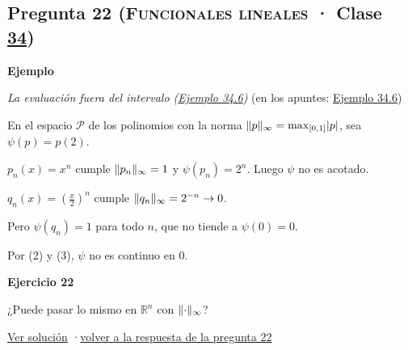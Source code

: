\documentclass[11pt,a4paper]{article}
\newcommand{\R}{\mathbb{R}}\newcommand{\N}{\mathbb{N}}\newcommand{\Q}{\mathbb{Q}}
\newcommand{\bloque}[1]{\par\smallskip\noindent\textbf{\color{acento}#1}\par}
\begin{document}
\subsection*{\hypertarget{e-22}{}Pregunta 22 \normalfont\small(\textsc{Funcionales lineales} · Clase \href{https://decostruttivismo.github.io/MAT2514-repaso/pdf/MAT2514_apuntes_completos.pdf\#nameddest=section.34}{34})}
\bloque{Ejemplo}
\textit{La evaluación fuera del intervalo (\href{https://decostruttivismo.github.io/MAT2514-repaso/pdf/MAT2514_apuntes_completos.pdf\#nameddest=teorema.34.6}{Ejemplo 34.6})} {\small(en los apuntes: \href{https://decostruttivismo.github.io/MAT2514-repaso/pdf/MAT2514_apuntes_completos.pdf\#nameddest=teorema.34.6}{Ejemplo 34.6})}
\begin{pasos}
\item[] En el espacio $\mathcal P$ de los polinomios con la norma $\lVert p\rVert_\infty=\max_{[0,1]}\lvert p\rvert$, sea $\psi(p)=p(2)$.
\item[(1)] $p_n(x)=x^n$ cumple $\lVert p_n\rVert_\infty=1$ y $\psi(p_n)=2^n$. Luego $\psi$ no es acotado.
\item[(2)] $q_n(x)=(\frac x2)^n$ cumple $\lVert q_n\rVert_\infty=2^{-n}\to0$.
\item[(3)] Pero $\psi(q_n)=1$ para todo $n$, que no tiende a $\psi(0)=0$.
\item[] Por (2) y (3), $\psi$ no es continuo en $0$.
\end{pasos}
\bloque{\hypertarget{x-22}{}Ejercicio 22}
¿Puede pasar lo mismo en $\R^n$ con $\lVert \cdot\rVert_\infty$?
\par{\small \hyperlink{s-22}{Ver solución} \quad·\quad \hyperlink{r-22}{volver a la respuesta de la pregunta 22}}
\end{document}
